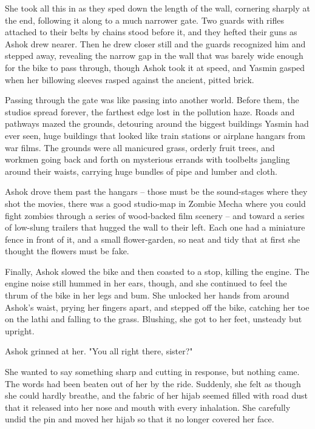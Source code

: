She took all this in as they sped down the length of the wall,
cornering sharply at the end, following it along to a much narrower
gate. Two guards with rifles attached to their belts by chains
stood before it, and they hefted their guns as Ashok drew nearer.
Then he drew closer still and the guards recognized him and stepped
away, revealing the narrow gap in the wall that was barely wide
enough for the bike to pass through, though Ashok took it at speed,
and Yasmin gasped when her billowing sleeves rasped against the
ancient, pitted brick.

Passing through the gate was like passing into another world.
Before them, the studios spread forever, the farthest edge lost in
the pollution haze. Roads and pathways mazed the grounds, detouring
around the biggest buildings Yasmin had ever seen, huge buildings
that looked like train stations or airplane hangars from war films.
The grounds were all manicured grass, orderly fruit trees, and
workmen going back and forth on mysterious errands with toolbelts
jangling around their waists, carrying huge bundles of pipe and
lumber and cloth.

Ashok drove them past the hangars -- those must be the sound-stages
where they shot the movies, there was a good studio-map in Zombie
Mecha where you could fight zombies through a series of wood-backed
film scenery -- and toward a series of low-slung trailers that
hugged the wall to their left. Each one had a miniature fence in
front of it, and a small flower-garden, so neat and tidy that at
first she thought the flowers must be fake.

Finally, Ashok slowed the bike and then coasted to a stop, killing
the engine. The engine noise still hummed in her ears, though, and
she continued to feel the thrum of the bike in her legs and bum.
She unlocked her hands from around Ashok's waist, prying her
fingers apart, and stepped off the bike, catching her toe on the
lathi and falling to the grass. Blushing, she got to her feet,
unsteady but upright.

Ashok grinned at her. "You all right there, sister?"

She wanted to say something sharp and cutting in response, but
nothing came. The words had been beaten out of her by the ride.
Suddenly, she felt as though she could hardly breathe, and the
fabric of her hijab seemed filled with road dust that it released
into her nose and mouth with every inhalation. She carefully undid
the pin and moved her hijab so that it no longer covered her face.

